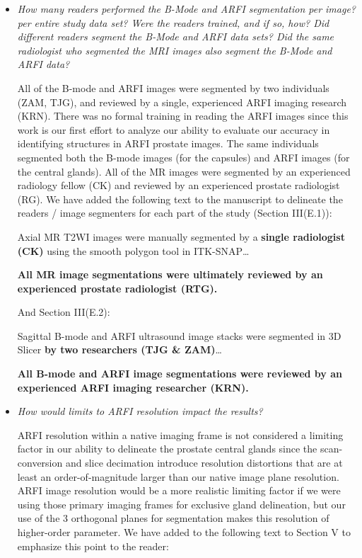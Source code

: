 \documentclass[10pt]{article}
\begin{document}
\begin{itemize}
    \item \textit{How many readers performed the B-Mode and ARFI segmentation
            per image? per entire study data set? Were the readers trained, and
            if so, how?  Did different readers segment the B-Mode and ARFI data
            sets?  Did the same radiologist who segmented the MRI images also
            segment the B-Mode and ARFI data?}

    All of the B-mode and ARFI images were segmented by two individuals (ZAM,
    TJG), and reviewed by a single, experienced ARFI imaging research (KRN).
    There was no formal training in reading the ARFI images since this work is
    our first effort to analyze our ability to evaluate our accuracy in
    identifying structures in ARFI prostate images.  The same individuals
    segmented both the B-mode images (for the capsules) and ARFI images (for
    the central glands).  All of the MR images were segmented by an experienced
    radiology fellow (CK) and reviewed by an experienced prostate radiologist
    (RG).  We have added the following text to the manuscript to delineate the
    readers / image segmenters for each part of the study (Section III(E.1)):

    Axial MR T2WI images were manually segmented by a \textbf{single
        radiologist (CK)} using the smooth polygon tool in ITK-SNAP\ldots

    \textbf{All MR image segmentations were ultimately reviewed by an
        experienced prostate radiologist (RTG).}

    And Section III(E.2):

    Sagittal B-mode and ARFI ultrasound image stacks were segmented in 3D
    Slicer \textbf{by two researchers (TJG \& ZAM)}\ldots

    \textbf{All B-mode and ARFI image segmentations were reviewed by an
        experienced ARFI imaging researcher (KRN).}


    \item \textit{How would limits to ARFI resolution impact the results?}

    ARFI resolution within a native imaging frame is not considered a limiting
    factor in our ability to delineate the prostate central glands since the
    scan-conversion and slice decimation introduce resolution distortions that
    are at least an order-of-magnitude larger than our native image plane
    resolution.  ARFI image resolution would be a more realistic limiting
    factor if we were using those primary imaging frames for exclusive gland
    delineation, but our use of the 3 orthogonal planes for segmentation makes
    this resolution of higher-order parameter.  We have added to the following
    text to Section V to emphasize this point to the reader:


\end{itemize}
\end{document}

